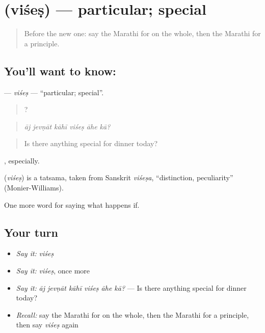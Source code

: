 \section[\texorpdfstring{\mr{विशेष} (viśeṣ)}{विशेष (viśeṣ)}]{ (viśeṣ) — particular; special}

\label{lesson:MR-C390-vises}



\begin{quote}
Before the new one: say the Marathi for on the whole, then the Marathi for a principle.
\end{quote}

\subsection*{You'll want to know: }
\textbf{} — \emph{viśeṣ} — \textquotedblleft{}particular; special\textquotedblright{}.

\begin{quote}
     ?
\end{quote}

\begin{quote}
\emph{āj jevṇāt kāhī viśeṣ āhe kā?}
\end{quote}

\begin{quote}
Is there anything special for dinner today?
\end{quote}

 , especially.

\begin{cousinweb}
\textbf{} (\emph{viśeṣ}) is a tatsama, taken from Sanskrit \emph{viśeṣa}, \textquotedblleft{}distinction, peculiarity\textquotedblright{} (Monier-Williams).
\end{cousinweb}

\begin{grammarlens}[title={What you've built}]
One more word for saying what happens if.
\end{grammarlens}

\subsection*{Your turn}
\begin{itemize}
\raggedright
  \item \emph{Say it:} \emph{viśeṣ}
  \item \emph{Say it:} \emph{viśeṣ}, once more
  \item \emph{Say it:} \emph{āj jevṇāt kāhī viśeṣ āhe kā?} — Is there anything special for dinner today?
  \item \emph{Recall:} say the Marathi for on the whole, then the Marathi for a principle, then say \emph{viśeṣ} again
\end{itemize}

